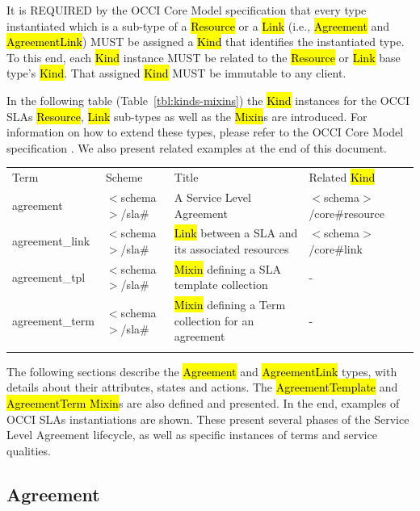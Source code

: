 \documentclass[10pt,a4paper]{article}
\begin{document}
It is REQUIRED by the OCCI Core Model specification that every type instantiated which is a sub-type of a \hl{Resource} or a \hl{Link} (i.e., \hl{Agreement} and \hl{AgreementLink}) MUST be assigned a \hl{Kind} that identifies the instantiated type. To this end, each \hl{Kind} instance MUST be related to the \hl{Resource} or \hl{Link} base type’s \hl{Kind}. That assigned \hl{Kind} MUST be immutable to any client.

In the following table (Table~\ref{tbl:kinds-mixins}) the \hl{Kind} instances for the OCCI SLAs \hl{Resource}, \hl{Link} sub-types as well as the \hl{Mixin}s are introduced. For information on how to extend these types, please refer to the OCCI Core Model specification \cite{occi:core}. We also present related examples at the end of this document.


	{
	\begin{tabular}{llll}
	\toprule
	Term & Scheme & Title & Related \hl{Kind} \\
	\colrule
	agreement &  $<$schema$>$/sla\# & A Service Level Agreement	& $<$schema$>$/core\#resource \\
	agreement\_link & $<$schema$>$/sla\# & \hl{Link} between a SLA and its associated resources	& $<$schema$>$/core\#link \\
	agreement\_tpl & $<$schema$>$/sla\# & \hl{Mixin} defining a SLA template collection	& - \\
	agreement\_term & $<$schema$>$/sla\# & \hl{Mixin} defining a Term collection for an agreement	& - \\
	\botrule
	\end{tabular}
}



The following sections describe the \hl{Agreement} and \hl{AgreementLink} types, with details about their attributes, states and actions. The \hl{AgreementTemplate} and \hl{AgreementTerm Mixin}s are also defined and presented. In the end, examples of OCCI SLAs instantiations are shown. These present several phases of the Service Level Agreement lifecycle, as well as specific instances of terms and service qualities.



\subsection{Agreement}
\end{document}
